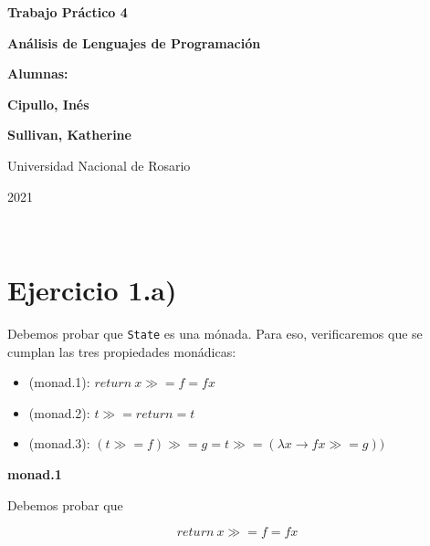 \documentclass[11pt]{article}
\begin{document}
\begin{titlepage}
    \begin{center}
        \vfill
        \vfill
            \vspace{0.7cm}
            \noindent\textbf{\Huge Trabajo Práctico 4}\par
            \noindent\textbf{\Huge Análisis de Lenguajes de Programación}\par
            \vspace{.5cm}
        \vfill
        \noindent \textbf{\huge Alumnas:}\par
        \vspace{.5cm}
        \noindent \textbf{\Large Cipullo, Inés}\par
        \noindent \textbf{\Large Sullivan, Katherine}\par
 
        \vfill
        \large Universidad Nacional de Rosario \par
        \noindent\large 2021
    \end{center}
\end{titlepage}
\ \par



\section*{Ejercicio 1.a)}

Debemos probar que \verb|State| es una mónada. Para eso, verificaremos que se cumplan las tres propiedades monádicas: 


\begin{itemize}
    \item (monad.1): $return\ x \mathrel{\gg \! \! =} f = f x$
    \item (monad.2): $t \mathrel{\gg \! \! =} return = t$
    \item (monad.3): $(t \mathrel{\gg \! \! =} f) \mathrel{\gg \! \! =} g = t \mathrel{\gg \! \! =} (\lambda x \to f x \mathrel{\gg \! \! =} g))$
\end{itemize} 

\textbf{monad.1}

Debemos probar que 

$$return\ x \mathrel{\gg \! \! =} f = f x$$
\end{document}
